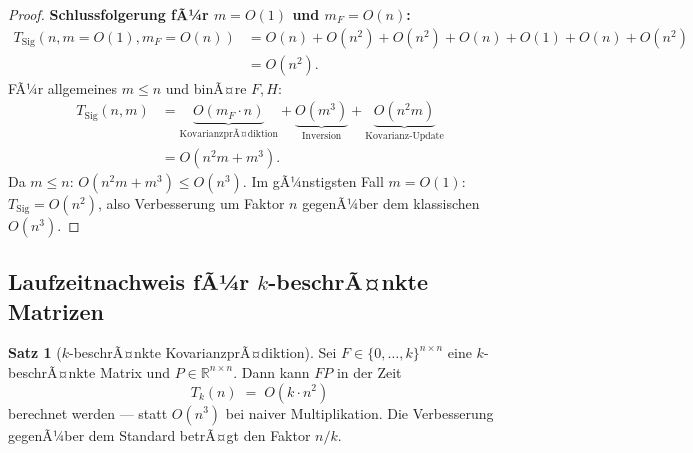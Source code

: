 ﻿\documentclass[a4paper,12pt]{article}
\theoremstyle{definition}
\newtheorem{satz}{Satz}
\begin{document}
\begin{proof}
\medskip
\textbf{Schlussfolgerung fÃ¼r $m = O(1)$ und $m_F = O(n)$:}
\begin{align*}
    T_{\mathrm{Sig}}(n, m=O(1), m_F=O(n))
    &= O(n) + O(n^2) + O(n^2) + O(n) + O(1) + O(n) + O(n^2) \\
    &= O(n^2).
\end{align*}
FÃ¼r allgemeines $m \leq n$ und binÃ¤re $F, H$:
\begin{align*}
    T_{\mathrm{Sig}}(n, m)
    &= \underbrace{O(m_F \cdot n)}_{\text{KovarianzprÃ¤diktion}}
     + \underbrace{O(m^3)}_{\text{Inversion}}
     + \underbrace{O(n^2 m)}_{\text{Kovarianz-Update}} \\
    &= O(n^2 m + m^3).
\end{align*}
Da $m \leq n$: $O(n^2 m + m^3) \leq O(n^3)$.
Im gÃ¼nstigsten Fall $m = O(1)$: $T_{\mathrm{Sig}} = O(n^2)$, also Verbesserung
um Faktor $n$ gegenÃ¼ber dem klassischen $O(n^3)$.
\end{proof}

\subsection{Laufzeitnachweis fÃ¼r $k$-beschrÃ¤nkte Matrizen}

\begin{satz}[$k$-beschrÃ¤nkte KovarianzprÃ¤diktion]
\label{satz:kbeschr}
    Sei $F \in \{0,\ldots,k\}^{n\times n}$ eine $k$-beschrÃ¤nkte Matrix und
    $P \in \mathbb{R}^{n\times n}$. Dann kann $FP$ in der Zeit
    \[
        T_k(n) \;=\; O(k \cdot n^2)
    \]
    berechnet werden --- statt $O(n^3)$ bei naiver Multiplikation.
    Die Verbesserung gegenÃ¼ber dem Standard betrÃ¤gt den Faktor $n/k$.
\end{satz}
\end{document}
